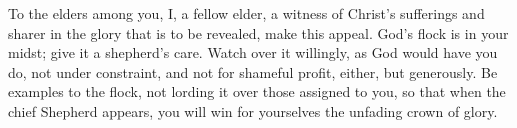 \lettrine[loversize=0.15,lines=2]{T}{}o the elders among you, I, a fellow elder, a witness of Christ’s sufferings and sharer in the glory that is to be revealed, make this appeal. God’s flock is in your midst; give it a shepherd’s care. Watch over it willingly, as God would have you do, not under constraint, and not for shameful profit, either, but generously. Be examples to the flock, not lording it over those assigned to you, so that when the chief Shepherd appears, you will win for yourselves the unfading crown of glory.
